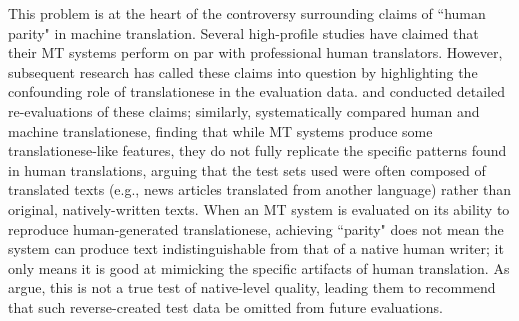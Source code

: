 \documentclass[11pt,a4paper]{article}
\begin{document}
This problem is at the heart of the controversy surrounding claims of ``human parity" in machine translation. Several high-profile studies have claimed that their MT systems perform on par with professional human translators. However, subsequent research has called these claims into question by highlighting the confounding role of translationese in the evaluation data. \citet{toral2018reassessing} and \citet{freitag2019translationese} conducted detailed re-evaluations of these claims; similarly, \citet{bizzoni2020human} systematically compared human and machine translationese, finding that while MT systems produce some translationese-like features, they do not fully replicate the specific patterns found in human translations, arguing that the test sets used were often composed of translated texts (e.g., news articles translated from another language) rather than original, natively-written texts. When an MT system is evaluated on its ability to reproduce human-generated translationese, achieving ``parity" does not mean the system can produce text indistinguishable from that of a native human writer; it only means it is good at mimicking the specific artifacts of human translation. As \citet{freitag2019translationese} argue, this is not a true test of native-level quality, leading them to recommend that such reverse-created test data be omitted from future evaluations.
\end{document}
